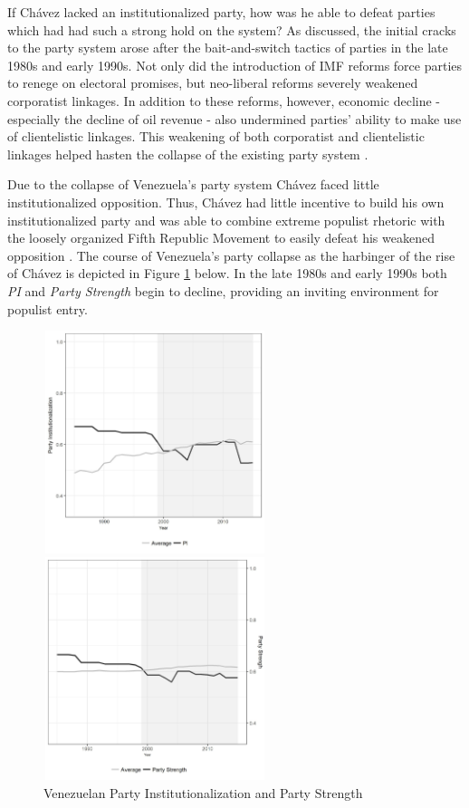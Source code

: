 \documentclass[a4paper,12pt]{article}\usepackage[]{graphicx}\usepackage[]{color}
\begin{document}
\par
If Ch\'{a}vez lacked an institutionalized party, how was he able to defeat parties which had had such a strong hold on the system? As discussed, the initial cracks to the party system arose after the bait-and-switch tactics of parties in the late 1980s and early 1990s. Not only did the introduction of IMF reforms force parties to renege on electoral promises, but neo-liberal reforms severely weakened corporatist linkages. In addition to these reforms, however, economic decline - especially the decline of oil revenue - also undermined parties' ability to make use of clientelistic linkages. This weakening of both corporatist and clientelistic linkages helped hasten the collapse of the existing party system \citep{roberts2003social, roberts2007latin}. 
\par
Due to the collapse of Venezuela's party system Ch\'{a}vez faced little institutionalized opposition. Thus, Ch\'{a}vez had little incentive to build his own institutionalized party and was able to combine extreme populist rhetoric with the loosely organized Fifth Republic Movement to easily defeat his weakened opposition \citep{hawkins2003populism}. The course of Venezuela's party collapse as the harbinger of the rise of Ch\'{a}vez is depicted in Figure \ref{venezuelapsi} below. In the late 1980s and early 1990s both \textit{PI} and \textit{Party Strength} begin to decline, providing an inviting environment for populist entry.  
\\
\begin{figure}[H]%
\centering

\parbox{2.5in}{\includegraphics[width=65mm, height=65mm]{venezuela1.jpg}}%
\qquad
\begin{minipage}{2in}%
\includegraphics[width=65mm, height=65mm]{venezuela2.jpg}
\end{minipage}%
\caption{Venezuelan Party Institutionalization and Party Strength}%
\label{venezuelapsi}%
\end{figure}
\end{document}
